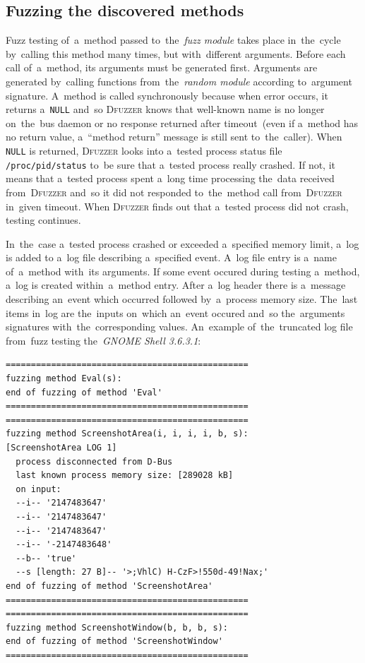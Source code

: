 \documentclass[conference]{IEEEtran}
\begin{document}
\subsection{Fuzzing the discovered methods}
Fuzz testing of~a~method passed to~the~\emph{fuzz module} takes place
in~the~cycle by~calling this method many times, but with~different arguments.
Before each call of~a~method, its arguments must be generated first. Arguments
are generated by~calling functions from~the~\emph{random module} according
to~argument signature.  A~method is called synchronously because when error
occurs, it returns a~\texttt{NULL} and~so \textsc{Dfuzzer} knows that well-known name is
no longer on~the~bus daemon or no response returned after timeout~(even if
a~method has no return value, a~``method return'' message is still sent
to~the~caller). When \texttt{NULL} is returned, \textsc{Dfuzzer} looks into a~tested
process status file \texttt{/proc/pid/status} to~be sure that a~tested process
really crashed. If not, it means that a~tested process spent a~long time
processing the~data received from~\textsc{Dfuzzer} and~so it did not responded
to~the~method call from~\textsc{Dfuzzer} in~given timeout. When \textsc{Dfuzzer} finds out that
a~tested process did not crash, testing continues.


In~the~case a~tested process crashed or exceeded a~specified memory limit,
a~log is added to a~log file describing a~specified event. A~log file entry
is a~name of~a~method with~its arguments. If some event occured during testing
a~method, a~log is created within~a~method entry. After a~log header there is a~message describing
an~event which occurred followed by~a~process memory size. The~last items in~log
are the~inputs on~which an~event occured and~so the~arguments signatures
with~the~corresponding values. An~example of~the~truncated log file from~fuzz
testing the~\emph{GNOME Shell 3.6.3.1}:
{
\footnotesize
\begin{verbatim}
================================================
fuzzing method Eval(s):
end of fuzzing of method 'Eval'
================================================
================================================
fuzzing method ScreenshotArea(i, i, i, i, b, s):
[ScreenshotArea LOG 1]
  process disconnected from D-Bus
  last known process memory size: [289028 kB]
  on input:
  --i-- '2147483647'
  --i-- '2147483647'
  --i-- '2147483647'
  --i-- '-2147483648'
  --b-- 'true'
  --s [length: 27 B]-- '>;VhlC) H-CzF>!550d-49!Nax;'
end of fuzzing of method 'ScreenshotArea'
================================================
================================================
fuzzing method ScreenshotWindow(b, b, b, s):
end of fuzzing of method 'ScreenshotWindow'
================================================
\end{verbatim}
}
\end{document}
